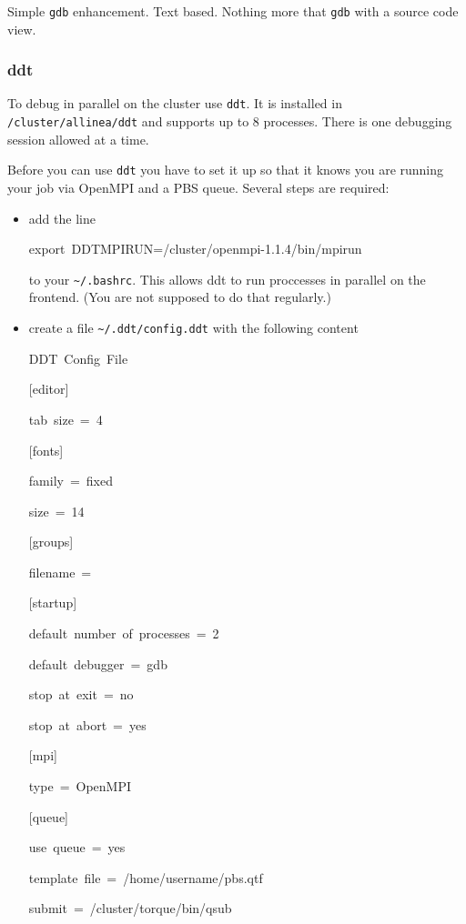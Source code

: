 Simple \texttt{gdb} enhancement. Text based. Nothing more that \texttt{gdb}
with a source code view.


\subsubsection{ddt}

To debug in parallel on the cluster use \texttt{ddt}. It is installed
in \texttt{/cluster/allinea/ddt} and supports up to 8 processes. There
is one debugging session allowed at a time.

Before you can use \texttt{ddt} you have to set it up so that it knows
you are running your job via OpenMPI and a PBS queue. Several steps
are required:

\begin{itemize}
\item add the line

\begin{lyxcode}
export~DDTMPIRUN=/cluster/openmpi-1.1.4/bin/mpirun
\end{lyxcode}
to your \texttt{\textasciitilde{}/.bashrc}. This allows ddt to run
proccesses in parallel on the frontend. (You are not supposed to do
that regularly.)

\item create a file \texttt{\textasciitilde{}/.ddt/config.ddt} with the
following content

\begin{lyxcode}
DDT~Config~File

{[}editor]~

tab~size~=~4

{[}fonts]~

family~=~fixed~

size~=~14

{[}groups]~

filename~=

{[}startup]~

default~number~of~processes~=~2~

default~debugger~=~gdb~

stop~at~exit~=~no~

stop~at~abort~=~yes

{[}mpi]~

type~=~OpenMPI

{[}queue]~

use~queue~=~yes~

template~file~=~/home/username/pbs.qtf~

submit~=~/cluster/torque/bin/qsub~


\end{lyxcode}
\end{itemize}
